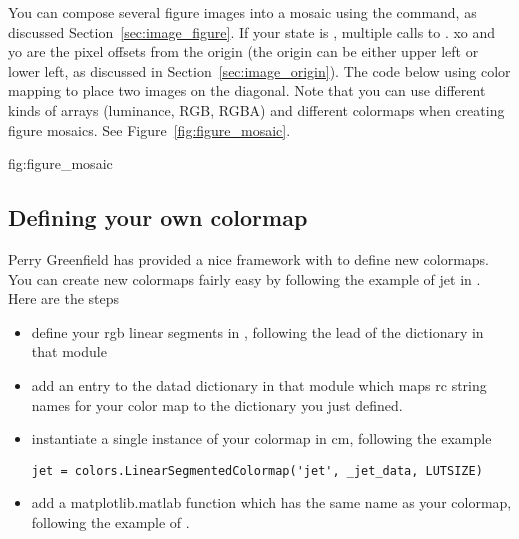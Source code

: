 \documentclass[twoside]{book}
\begin{document}
You can compose several figure images into a mosaic using the
 command, as discussed Section~\ref{sec:image_figure}.  If
your  state is , multiple calls to
.  xo and yo are the pixel offsets from
the origin (the origin can be either upper left or lower left, as
discussed in Section~\ref{sec:image_origin}).  The code below using color
mapping to place two images on the diagonal.  Note that you can use
different kinds of arrays (luminance, RGB, RGBA) and different
colormaps when creating figure mosaics.  See
Figure~\ref{fig:figure_mosaic}.

{fig:figure_mosaic}




\subsection{Defining your own colormap}

Perry Greenfield has provided a nice framework with
 to define new
colormaps.  You can create new colormaps fairly easy by following the
example of jet in .  Here are the steps

\begin{itemize}
\item define your rgb linear segments in ,
  following the lead of the  dictionary in that module
  
\item add an entry to the datad dictionary in that module which maps
  rc string names for your color map to the dictionary you just
  defined.
  
\item instantiate a single instance of your colormap in cm, following
  the example 

\begin{lstlisting}
jet = colors.LinearSegmentedColormap('jet', _jet_data, LUTSIZE)
\end{lstlisting}

\item{add a matplotlib.matlab function which has the same name as your
    colormap, following the example of .}
\end{itemize}
\end{document}
